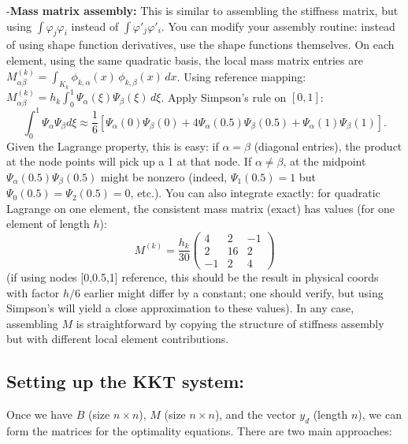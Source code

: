 \documentclass[a4paper,10pt]{report}
\begin{document}
-\textbf{Mass matrix assembly:} This is similar to assembling the stiffness matrix, but using \(\int \varphi_j \varphi_i\) instead of \(\int \varphi'_j \varphi'_i\). You can modify your assembly routine: instead of using shape function derivatives, use the shape functions themselves. On each element, using the same quadratic basis, the local mass matrix entries are \(M^{(k)}_{\alpha\beta} = \int_{K_k} \phi_{k,\alpha}(x)\,\phi_{k,\beta}(x)\,dx\). Using reference mapping: \(M^{(k)}_{\alpha\beta} = h_k \int_0^1 \Psi_\alpha(\xi)\Psi_\beta(\xi)\,d\xi\). Apply Simpson's rule on \([0,1]\):
\[\int_0^1 \Psi_\alpha \Psi_\beta d\xi \approx \frac{1}{6}[\Psi_\alpha(0)\Psi_\beta(0) + 4\Psi_\alpha(0.5)\Psi_\beta(0.5) + \Psi_\alpha(1)\Psi_\beta(1)].\]
Given the Lagrange property, this is easy: if \(\alpha=\beta\) (diagonal entries), the product at the node points will pick up a 1 at that node. If \(\alpha \neq \beta\), at the midpoint \(\Psi_\alpha(0.5)\Psi_\beta(0.5)\) might be nonzero (indeed, \(\Psi_1(0.5)=1\) but \(\Psi_0(0.5)=\Psi_2(0.5)=0\), etc.). You can also integrate exactly: for quadratic Lagrange on one element, the consistent mass matrix (exact) has values (for one element of length \(h\)):
$$M^{(k)} = \frac{h_k}{30}
	\begin{pmatrix}
		4  & 2  & -1 \\
		2  & 16 & 2  \\
		-1 & 2  & 4
	\end{pmatrix}$$
(if using nodes [0,0.5,1] reference, this should be the result in physical coords with factor \(h/6\) earlier might differ by a constant; one should verify, but using Simpson's will yield a close approximation to these values). In any case, assembling \(M\) is straightforward by copying the structure of stiffness assembly but with different local element contributions.

\subsection{Setting up the KKT system:} Once we have \(B\) (size \(n\times n\)), \(M\) (size \(n\times n\)), and the vector \(y_d\) (length \(n\)), we can form the matrices for the optimality equations. There are two main approaches:
\end{document}
